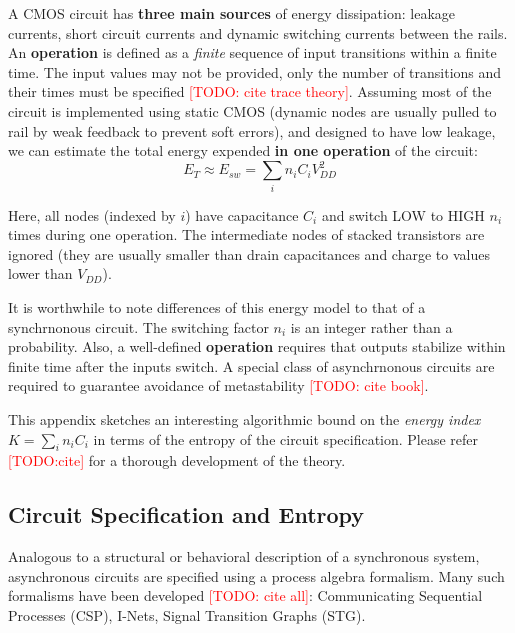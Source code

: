 A CMOS circuit has \textbf{three main sources} of energy dissipation: leakage currents,
short circuit currents and dynamic switching currents between the rails.
An \textbf{operation} is defined as a \emph{finite} sequence of input transitions
within a finite time. The input values may not be provided, only the number of
transitions and their times must be specified 
\textcolor{red}{[TODO: cite trace theory]}.
Assuming most of the circuit is implemented using static CMOS (dynamic nodes
are usually pulled to rail by weak feedback to prevent soft errors), and 
designed to have low leakage, we can estimate the total energy expended
\textbf{in one operation} of the circuit:
\begin{equation}
	E_T \approx E_{sw} = \sum_{i} n_i C_i V_{DD}^2 
\end{equation}

Here, all nodes (indexed by $i$) have capacitance $C_i$ and switch
 LOW to HIGH $n_i$ times during one operation.
The intermediate nodes of stacked transistors are ignored (they are usually smaller than drain
capacitances and charge to values lower than $V_{DD}$).

It is worthwhile to note differences of this energy model to that of a
synchrnonous circuit. The switching factor $n_i$ is an integer rather than a probability. 
Also, a well-defined \textbf{operation} requires that outputs stabilize within
finite time after the inputs switch. A special class of asynchrnonous circuits 
are required to guarantee avoidance of metastability \textcolor{red}{[TODO:
cite book]}.

This appendix sketches an interesting algorithmic bound on the \emph{energy index} 
$K = \sum_i n_i C_i$ in terms of the entropy of the circuit specification.
Please refer \textcolor{red}{[TODO:cite]} for a thorough development of the
theory.

\subsection{Circuit Specification and Entropy}

Analogous to a structural or behavioral description of a synchronous system,
asynchronous circuits are specified using a process algebra formalism. Many
such formalisms have been developed \textcolor{red}{[TODO: cite all]}: Communicating
Sequential Processes (CSP), I-Nets, Signal Transition Graphs (STG). 


